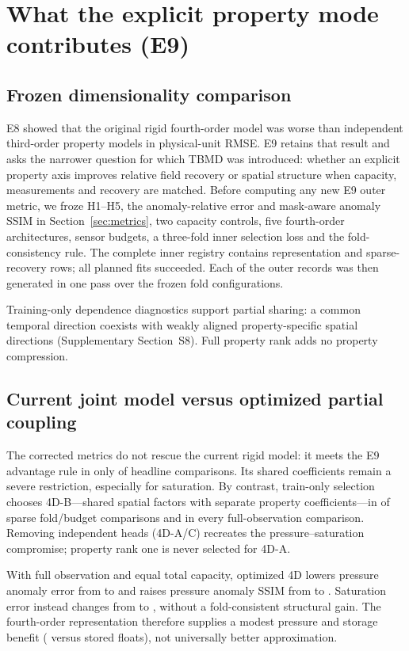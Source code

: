 \section{What the explicit property mode contributes (E9)}
\label{sec:e9}

\subsection{Frozen dimensionality comparison}
E8 showed that the original rigid fourth-order model was worse than independent third-order property models in physical-unit RMSE. E9 retains that result and asks the narrower question for which TBMD was introduced: whether an explicit property axis improves relative field recovery or spatial structure when capacity, measurements and recovery are matched. Before computing any new E9 outer metric, we froze H1--H5, the anomaly-relative error and mask-aware anomaly SSIM in Section~\ref{sec:metrics}, two capacity controls, five fourth-order architectures, sensor budgets, a three-fold inner selection loss and the fold-consistency rule. The complete inner registry contains \ENineRepresentationRows{} representation and \ENineSparseRows{} sparse-recovery rows; all planned fits succeeded. Each of the \ENineOuterRows{} outer records was then generated in one pass over the frozen fold configurations.

Training-only dependence diagnostics support partial sharing: a common temporal direction coexists with weakly aligned property-specific spatial directions (Supplementary Section~S8). Full property rank adds no property compression.

\subsection{Current joint model versus optimized partial coupling}
The corrected metrics do not rescue the current rigid model: it meets the E9 advantage rule in only \ENineCurrentAdvantages{} of \ENineHeadlineComparisons{} headline comparisons. Its shared coefficients remain a severe restriction, especially for saturation. By contrast, train-only selection chooses 4D-B---shared spatial factors with separate property coefficients---in \ENineSharedHeadSelections{} of \ENineSparseSelections{} sparse fold/budget comparisons and in every full-observation comparison. Removing independent heads (4D-A/C) recreates the pressure--saturation compromise; property rank one is never selected for 4D-A.

With full observation and equal total capacity, optimized 4D lowers pressure anomaly error from \ENineFullThreeErrorP{} to \ENineFullFourErrorP{} and raises pressure anomaly SSIM from \ENineFullThreeSsimP{} to \ENineFullFourSsimP. Saturation error instead changes from \ENineFullThreeErrorSo{} to \ENineFullFourErrorSo, without a fold-consistent structural gain. The fourth-order representation therefore supplies a modest pressure and storage benefit (\ENineFullFourStorage{} versus \ENineFullThreeStorage{} stored floats), not universally better approximation.

